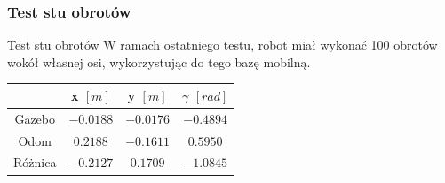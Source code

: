\begin{frame}
	\frametitle{Test stu obrotów}
	\begin{block}{Test stu obrotów}
		W ramach ostatniego testu, robot miał wykonać 100 obrotów wokół własnej osi, wykorzystując
		do tego bazę mobilną.
	\end{block}
	\begin{table}[]
		\begin{tabular}{c|c|c|c}
			   & x $[m]$       & y $[m]$     & $\gamma$ $[rad]$  \\ \hline
		Gazebo & $\num{-0.0188}$ & $\num{-0.0176}$ & $\num{-0.4894}$  \\ \hline
		Odom   & $\num{0.2188}$ & $\num{-0.1611}$ & $\num{0.5950}$ \\ \hline \hline
		Różnica & $\num{-0.2127}$ & $\num{0.1709}$  & $\num{-1.0845}$ 
		\end{tabular}
	\end{table}
\end{frame}